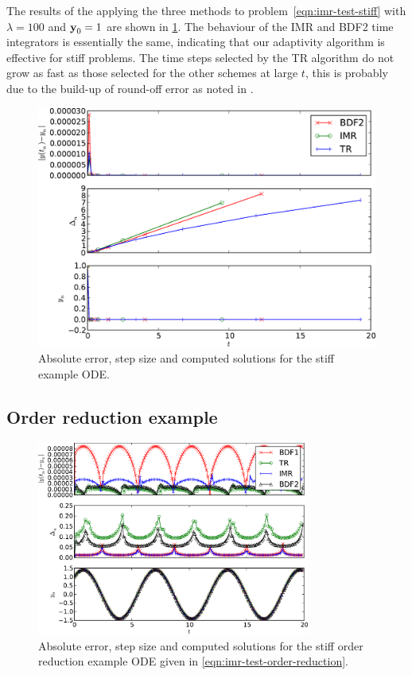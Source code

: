The results of the applying the three methods to problem~\cref{eqn:imr-test-stiff} with $\lambda = 100$ and $\boldsymbol{\mathrm{y}}_0 = 1$ are shown in \cref{fig:imr-stiff-example}.
The behaviour of the IMR and BDF2 time integrators is essentially the same, indicating that our adaptivity algorithm is effective for stiff problems.
The time steps selected by the TR algorithm do not grow as fast as those selected for the other schemes at large $t$, this is probably due to the build-up of round-off error as noted in \eg \cite{Gresho2008}.

\begin{figure}
  \centering
  \includegraphics[width=1\textwidth]{plots/aimr_odes_traces/simple_stiff-errornormsvs-dtsvs-tracevaluesvstimes}
  \caption{Absolute error, step size and computed solutions for the stiff example ODE.}
  \label{fig:imr-stiff-example}
\end{figure}


\subsection{Order reduction example}
\label{sec:order-reduct-example}

\begin{figure}
  \centering  \includegraphics[width=0.8\textwidth]{plots/aimr_odes_traces/strong_order_reduction-errornormsvs-dtsvs-tracevaluesvstimes}
  \caption{Absolute error, step size and computed solutions for the stiff order reduction example ODE given in \cref{eqn:imr-test-order-reduction}.}
  \label{fig:imr-order-reduction-example}
\end{figure}


